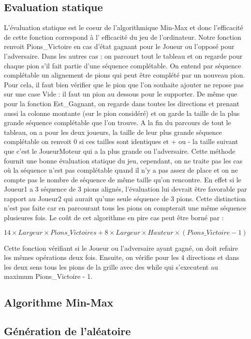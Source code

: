 \documentclass[a4paper, 10pt, french]{article}
\begin{document}
{    \subsection{Evaluation statique}
    {
        L'évaluation statique est le coeur de l'algorithmique Min-Max et donc l'efficacité de cette fonction correspond à l'
        efficacité du jeu de l'ordinateur. Notre fonction renvoit Pions\_Victoire en cas d'état gagnant pour le Joueur ou
        l'opposé pour l'adversaire.
        Dans les autres cas : on parcourt tout le tableau et on regarde pour chaque pion s'il fait partie d'une séquence
        complétable. On entend par séquence complétable un alignement de pions qui peut être complété par un nouveau pion.
        Pour cela, il faut bien vérifier que le pion que l'on souhaite ajouter ne repose pas sur une case Vide : il faut un pion au
        dessous pour le supporter.
        De même que pour la fonction Est\_Gagnant, on regarde dans toutes les directions et prenant aussi la colonne montante (sur
        le pion considéré) et on garde la taille de la plus grande séquence complétable que l'on trouve.
        A la fin du parcours de tout le tableau, on a pour les deux joueurs, la taille de leur plus grande séquence complétable
        on renvoit 0 si ces tailles sont identiques et + ou - la taille suivant que c'est le JoueurMoteur qui a la plus grande
        ou l'adversaire.
        Cette méthode fournit une bonne évaluation statique du jeu, cependant, on ne traite pas les cas où la séquence n'est pas
        complétable quand il n'y a pas assez de place et on ne compte pas le nombre de séquence de même taille qu'on rencontre.
        En effet si le Joueur1 a 3 séquence de 3 pions alignés, l'évaluation lui devrait être favorable par rapport au Joueur2
        qui aurait qu'une seule séquence de 3 pions. Cette distinction n'est pas faite car en parcourant tous les pions on
        compterait une même séquence plusieures fois.
        Le coût de cet algorithme en pire cas peut être borné par :
        \begin{center}
            $14 \times Largeur \times Pions\_Victoires + 8 \times Largeur \times Hauteur \times (Pions\_Victoire - 1)$
        \end{center}
        Cette fonction vérifiant si le Joueur ou l'adversaire ayant gagné, on doit refaire les mêmes opérations deux fois.
        Ensuite, on vérifie pour les 4 directions et dans les deux sens tous les pions de la grille avec des while qui
        s'executent au maximum Pions\_Victoire - 1.
    }

    \subsection{Algorithme Min-Max}
    {
    }

    \subsection{Génération de l'aléatoire}
    {
    }
}   
\end{document}
